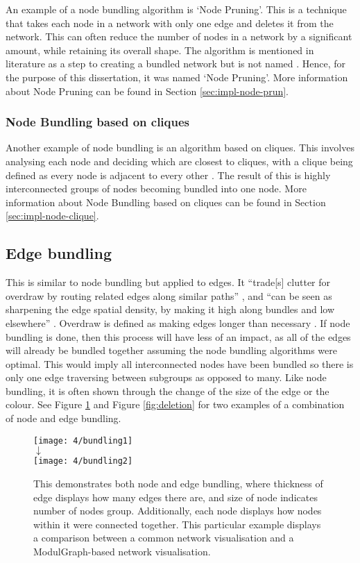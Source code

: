 \documentclass[../dissertation.tex]{subfiles}
\begin{document}
An example of a node bundling algorithm is `Node Pruning'. This is a technique that takes each node in a network with only one edge and deletes it from the network. This can often reduce the number of nodes in a network by a significant amount, while retaining its overall shape. The algorithm is mentioned in literature as a step to creating a bundled network but is not named \cite{brandes2003experiments}. Hence, for the purpose of this dissertation, it was named `Node Pruning'. More information about Node Pruning can be found in Section \ref{sec:impl-node-prun}.

\subsubsection{Node Bundling based on cliques}
\label{sec:node-bundling-cliques}

Another example of node bundling is an algorithm based on cliques. This involves analysing each node and deciding which are closest to cliques, with a clique being defined as every node is adjacent to every other \cite{roberts1971characterization}. The result of this is highly interconnected groups of nodes becoming bundled into one node. More information about Node Bundling based on cliques can be found in Section \ref{sec:impl-node-clique}.

\subsection{Edge bundling}
\label{sec:edge_bundling}

This is similar to node bundling but applied to edges. It ``trade[s] clutter for overdraw by routing related edges along similar paths'' \cite{hurter2012graph}, and ``can be seen as sharpening the edge spatial density, by making it high along bundles and low elsewhere'' \cite{hurter2012graph}. Overdraw is defined as making edges longer than necessary \cite{gansner2011multilevel}. If node bundling is done, then this process will have less of an impact, as all of the edges will already be bundled together assuming the node bundling algorithms were optimal. This would imply all interconnected nodes have been bundled so there is only one edge traversing between subgroups as opposed to many. Like node bundling, it is often shown through the change of the size of the edge or the colour. See Figure \ref{fig:bundling} and Figure \ref{fig:deletion} for two examples of a combination of node and edge bundling.
\begin{figure}[htb]
    \centering
    \texttt{[image: 4/bundling1]}
    \\$\downarrow$\\
    \texttt{[image: 4/bundling2]}
    \caption{This demonstrates both node and edge bundling, where thickness of edge displays how many edges there are, and size of node indicates number of nodes group. Additionally, each node displays how nodes within it were connected together. This particular example displays a comparison between a common network visualisation and a ModulGraph-based network visualisation. \cite{li2015modulgraph}}
    \label{fig:bundling}
\end{figure}
\end{document}
